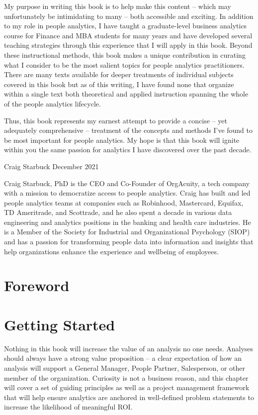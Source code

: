 \documentclass[]{book}
\begin{document}
My purpose in writing this book is to help make this content -- which may unfortunately be intimidating to many -- both accessible and exciting. In addition to my role in people analytics, I have taught a graduate-level business analytics course for Finance and MBA students for many years and have developed several teaching strategies through this experience that I will apply in this book. Beyond these instructional methods, this book makes a unique contribution in curating what I consider to be the most salient topics for people analytics practitioners. There are many texts available for deeper treatments of individual subjects covered in this book but as of this writing, I have found none that organize within a single text both theoretical and applied instruction spanning the whole of the people analytics lifecycle.

Thus, this book represents my earnest attempt to provide a concise -- yet adequately comprehensive -- treatment of the concepts and methods I've found to be most important for people analytics. My hope is that this book will ignite within you the same passion for analytics I have discovered over the past decade.

Craig Starbuck
December 2021

Craig Starbuck, PhD is the CEO and Co-Founder of OrgAcuity, a tech company with a mission to democratize access to people analytics. Craig has built and led people analytics teams at companies such as Robinhood, Mastercard, Equifax, TD Ameritrade, and Scottrade, and he also spent a decade in various data engineering and analytics positions in the banking and health care industries. He is a Member of the Society for Industrial and Organizational Psychology (SIOP) and has a passion for transforming people data into information and insights that help organizations enhance the experience and wellbeing of employees.

\hypertarget{foreword}{%
\chapter*{Foreword}\label{foreword}}

\hypertarget{getting-started}{%
\chapter{Getting Started}\label{getting-started}}

Nothing in this book will increase the value of an analysis no one needs. Analyses should always have a strong value proposition -- a clear expectation of how an analysis will support a General Manager, People Partner, Salesperson, or other member of the organization. Curiosity is not a business reason, and this chapter will cover a set of guiding principles as well as a project management framework that will help ensure analytics are anchored in well-defined problem statements to increase the likelihood of meaningful ROI.
\end{document}
